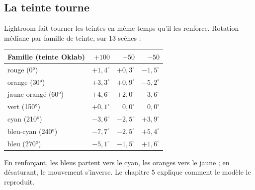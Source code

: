 \subsection{La teinte tourne}
Lightroom fait tourner les teintes en même temps qu'il les renforce. Rotation
médiane par famille de teinte, sur 13 scènes :

\begin{center}
\begin{tabular}{lrrr}
\toprule
Famille (teinte Oklab) & $+100$ & $+50$ & $-50$\\
\midrule
rouge (0°) & $+1{,}4^\circ$ & $+0{,}3^\circ$ & $-1{,}5^\circ$\\
orange (30°) & $+3{,}3^\circ$ & $+0{,}9^\circ$ & $-5{,}2^\circ$\\
jaune-orangé (60°) & $+4{,}6^\circ$ & $+2{,}0^\circ$ & $-3{,}6^\circ$\\
vert (150°) & $+0{,}1^\circ$ & $0{,}0^\circ$ & $0{,}0^\circ$\\
cyan (210°) & $-3{,}6^\circ$ & $-2{,}5^\circ$ & $+3{,}9^\circ$\\
bleu-cyan (240°) & $-7{,}7^\circ$ & $-2{,}5^\circ$ & $+5{,}4^\circ$\\
bleu (270°) & $-5{,}1^\circ$ & $-1{,}5^\circ$ & $+1{,}6^\circ$\\
\bottomrule
\end{tabular}
\end{center}

En renforçant, les bleus partent vers le cyan, les oranges vers le jaune ; en
désaturant, le mouvement s'inverse. Le chapitre 5 explique comment le modèle
le reproduit.


